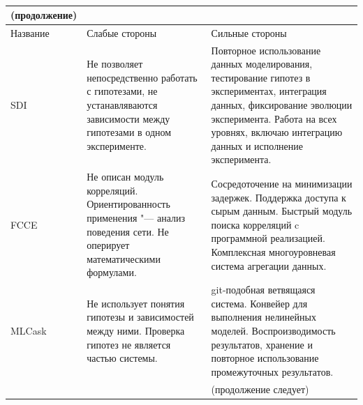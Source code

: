 \begin{table} [ht]%
	\caption*{}%
    \setlength\extrarowheight{0pt} %
    \setlength{\tymin}{2.5cm}%
	\begin{tabulary}{\textwidth}{@{}>{\zz}L >{\zz}L >{\zz}L@{}}%
        \toprule     %
        \scriptsize (продолжение) & & 
        \\
        \midrule
    	Название &
    	Слабые стороны &
    	Сильные стороны	\\
        \midrule %
        
        SDI &
        Не позволяет непосредственно работать с гипотезами, не устанавляваются зависимости между гипотезами в 
        одном эксперименте.   &
        Повторное использование данных моделирования, тестирование гипотез в экспериментах, интеграция данных, 
        фиксирование эволюции эксперимента. Работа на всех уровнях, включаю интеграцию данных и исполнение 
        эксперимента.
        \\
        \midrule
        FCCE &
        Не описан модуль корреляций. Ориентированность применения "--- анализ поведения сети. 
        Не оперирует математическими формулами. 
        &
        Сосредоточение на минимизации задержек. Поддержка доступа к сырым данным. Быстрый модуль поиска корреляций c 
        программной реализацией. Комплексная многоуровневая система агрегации данных.
        \\
        \midrule
        MLCask &
        Не использует понятия гипотезы и зависимостей между ними. Проверка гипотез не является частью системы. &
        git-подобная ветвящаяся система. Конвейер для выполнения нелинейных моделей.
        Воспроизводимость результатов, хранение и повторное использование промежуточных результатов.
        \\
        \midrule
        & &  \scriptsize (продолжение следует)
        \\
        \bottomrule %
	\end{tabulary}%
\end{table}

